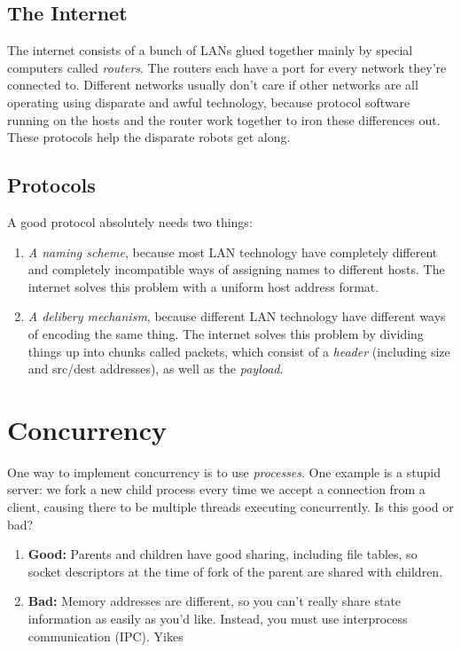 \documentclass[fleqn]{article}
\begin{document}
\subsection{The Internet}

The internet consists of a bunch of LANs glued together mainly by special computers called \textit{routers}. The routers each have a port for every network they're connected to. Different networks usually don't care if other networks are all operating using disparate and awful technology, because protocol software running on the hosts and the router work together to iron these differences out. These protocols help the disparate robots get along.

\subsection{Protocols}

A good protocol absolutely needs two things:

\begin{enumerate}
\item \textit{A naming scheme}, because most LAN technology have completely different and completely incompatible ways of assigning names to different hosts. The internet solves this problem with a uniform host address format.

\item \textit{A delibery mechanism}, because different LAN technology have different ways of encoding the same thing. The internet solves this problem by dividing things up into chunks called packets, which consist of a \textit{header} (including size and src/dest addresses), as well as the \textit{payload}.
\end{enumerate}

\section{Concurrency}

One way to implement concurrency is to use \textit{processes}. One example is a stupid server: we fork a new child process every time we accept a connection from a client, causing there to be multiple threads executing concurrently. Is this good or bad?

\begin{enumerate}
\item \textbf{Good:} Parents and children have good sharing, including file tables, so socket descriptors at the time of fork of the parent are shared with children.

\item \textbf{Bad:} Memory addresses are different, so you can't really share state information as easily as you'd like. Instead, you must use interprocess communication (IPC). Yikes
\end{enumerate}
\end{document}
